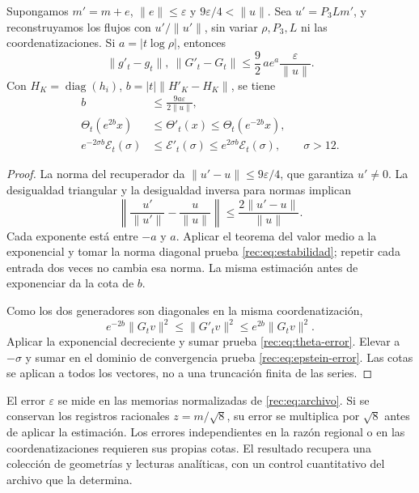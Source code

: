 \begin{theorem}
\label{rec:thm:estabilidad}
Supongamos \(m'=m+e\), \(\|e\|\le\varepsilon\) y \(9\varepsilon/4<\|u\|\). Sea \(u'=P_3Lm'\), y reconstruyamos los flujos con \(u'/\|u'\|\), sin variar \(\rho,P_3,L\) ni las coordenatizaciones. Si \(a=|t\log\rho|\), entonces
\begin{equation}
 \|g'_t-g_t\|,\ \|G'_t-G_t\|
 \le\frac92\,a e^a\frac{\varepsilon}{\|u\|}.
 \label{rec:eq:estabilidad}
\end{equation}
Con \(H_K=\operatorname{diag}(h_i)\), \(b=|t|\|H'_K-H_K\|\), se tiene
\begin{align}
 b&\le\frac{9a\varepsilon}{2\|u\|},\nonumber\\
 \Theta_t(e^{2b}x)&\le\Theta'_t(x)\le\Theta_t(e^{-2b}x),\label{rec:eq:theta-error}\\
 e^{-2\sigma b}\mathcal E_t(\sigma)&\le\mathcal E'_t(\sigma)
             \le e^{2\sigma b}\mathcal E_t(\sigma),\qquad\sigma>12.
 \label{rec:eq:epstein-error}
\end{align}
\end{theorem}
\begin{proof}
La norma del recuperador da \(\|u'-u\|\le9\varepsilon/4\), que garantiza \(u'\ne0\). La desigualdad triangular y la desigualdad inversa para normas implican
\[
 \left\|\frac{u'}{\|u'\|}-\frac{u}{\|u\|}\right\|
 \le\frac{2\|u'-u\|}{\|u\|}.
\]
Cada exponente está entre \(-a\) y \(a\). Aplicar el teorema del valor medio a la exponencial y tomar la norma diagonal prueba \eqref{rec:eq:estabilidad}; repetir cada entrada dos veces no cambia esa norma. La misma estimación antes de exponenciar da la cota de \(b\).

Como los dos generadores son diagonales en la misma coordenatización,
\[
 e^{-2b}\|G_tv\|^2\le\|G'_tv\|^2\le e^{2b}\|G_tv\|^2.
\]
Aplicar la exponencial decreciente y sumar prueba \eqref{rec:eq:theta-error}. Elevar a \(-\sigma\) y sumar en el dominio de convergencia prueba \eqref{rec:eq:epstein-error}. Las cotas se aplican a todos los vectores, no a una truncación finita de las series.
\end{proof}

El error \(\varepsilon\) se mide en las memorias normalizadas de \eqref{rec:eq:archivo}. Si se conservan los registros racionales \(z=m/\sqrt8\), su error se multiplica por \(\sqrt8\) antes de aplicar la estimación. Los errores independientes en la razón regional o en las coordenatizaciones requieren sus propias cotas. El resultado recupera una colección de geometrías y lecturas analíticas, con un control cuantitativo del archivo que la determina.
